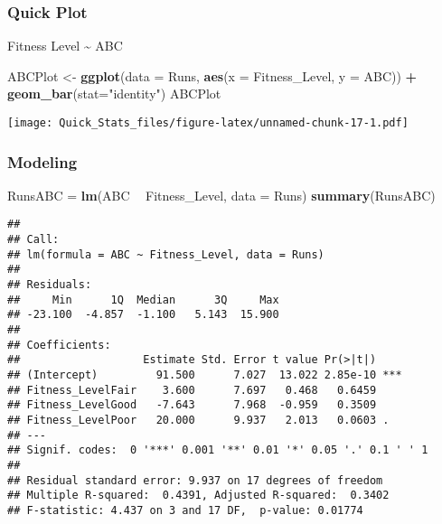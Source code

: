 \documentclass[]{article}
\newenvironment{Shaded}{\begin{snugshade}}{\end{snugshade}}
\newcommand{\KeywordTok}[1]{\textcolor[rgb]{0.13,0.29,0.53}{\textbf{#1}}}
\newcommand{\DataTypeTok}[1]{\textcolor[rgb]{0.13,0.29,0.53}{#1}}
\newcommand{\StringTok}[1]{\textcolor[rgb]{0.31,0.60,0.02}{#1}}
\newcommand{\OperatorTok}[1]{\textcolor[rgb]{0.81,0.36,0.00}{\textbf{#1}}}
\newcommand{\NormalTok}[1]{#1}
\begin{document}
\subsubsection{Quick Plot}\label{quick-plot-3}

Fitness Level \textasciitilde{} ABC

\begin{Shaded}
\begin{Highlighting}[]
\NormalTok{ABCPlot <-}\StringTok{ }\KeywordTok{ggplot}\NormalTok{(}\DataTypeTok{data =}\NormalTok{ Runs, }\KeywordTok{aes}\NormalTok{(}\DataTypeTok{x =}\NormalTok{ Fitness_Level, }\DataTypeTok{y =}\NormalTok{ ABC)) }\OperatorTok{+}
\StringTok{  }\KeywordTok{geom_bar}\NormalTok{(}\DataTypeTok{stat=}\StringTok{"identity"}\NormalTok{)}
\NormalTok{ABCPlot}
\end{Highlighting}
\end{Shaded}

\texttt{[image: Quick\_Stats\_files/figure-latex/unnamed-chunk-17-1.pdf]}

\subsubsection{Modeling}\label{modeling-3}

\begin{Shaded}
\begin{Highlighting}[]
\NormalTok{RunsABC =}\StringTok{ }\KeywordTok{lm}\NormalTok{(ABC }\OperatorTok{~}\StringTok{ }\NormalTok{Fitness_Level, }\DataTypeTok{data =}\NormalTok{ Runs)}
\KeywordTok{summary}\NormalTok{(RunsABC)}
\end{Highlighting}
\end{Shaded}

\begin{verbatim}
## 
## Call:
## lm(formula = ABC ~ Fitness_Level, data = Runs)
## 
## Residuals:
##     Min      1Q  Median      3Q     Max 
## -23.100  -4.857  -1.100   5.143  15.900 
## 
## Coefficients:
##                   Estimate Std. Error t value Pr(>|t|)    
## (Intercept)         91.500      7.027  13.022 2.85e-10 ***
## Fitness_LevelFair    3.600      7.697   0.468   0.6459    
## Fitness_LevelGood   -7.643      7.968  -0.959   0.3509    
## Fitness_LevelPoor   20.000      9.937   2.013   0.0603 .  
## ---
## Signif. codes:  0 '***' 0.001 '**' 0.01 '*' 0.05 '.' 0.1 ' ' 1
## 
## Residual standard error: 9.937 on 17 degrees of freedom
## Multiple R-squared:  0.4391, Adjusted R-squared:  0.3402 
## F-statistic: 4.437 on 3 and 17 DF,  p-value: 0.01774
\end{verbatim}
\end{document}

